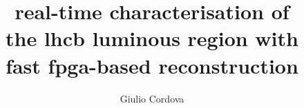\title{real-time characterisation of\\[-25pt]the lhc\textup{\LARGE{\textmd{\textbf{b}}}} luminous region with \\fast fpga-based reconstruction}
\author{Giulio Cordova}



